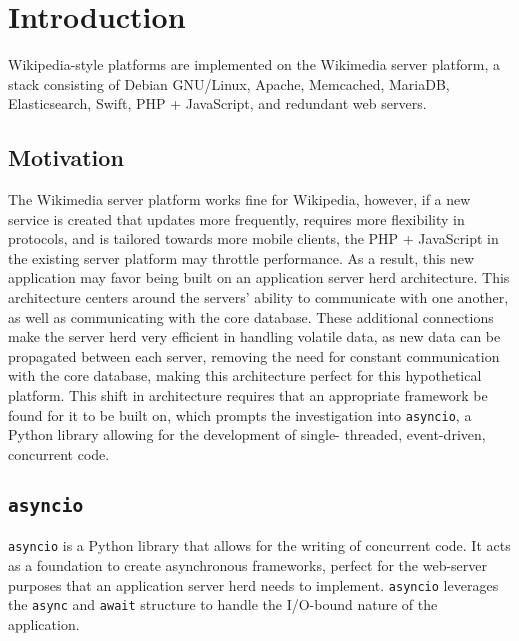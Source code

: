 \section{Introduction}
\par
Wikipedia-style platforms are implemented on the Wikimedia server platform, a
stack consisting of Debian GNU/Linux, Apache, Memcached, MariaDB, Elasticsearch,
Swift, PHP + JavaScript, and redundant web servers. 

\subsection{Motivation}
\par
The Wikimedia server platform works fine for Wikipedia, however, if a new
service is created that updates more frequently, requires more flexibility in
protocols, and is tailored towards more mobile clients, the PHP + JavaScript in
the existing server platform may throttle performance. As a result, this new
application may favor being built on an application server herd architecture.
This architecture centers around the servers' ability to communicate with one
another, as well as communicating with the core database. These additional
connections make the server herd very efficient in handling volatile data, as
new data can be propagated between each server, removing the need for constant
communication with the core database, making this architecture perfect for this
hypothetical platform. This shift in architecture requires that an appropriate
framework be found for it to be built on, which prompts the investigation into
\texttt{asyncio}, a Python library allowing for the development of single-
threaded, event-driven, concurrent code.

\subsection{\texttt{asyncio}}
\par
\texttt{asyncio} is a Python library that allows for the writing of concurrent
code. It acts as a foundation to create asynchronous frameworks, perfect for the
web-server purposes that an application server herd needs to implement.
\texttt{asyncio} leverages the \texttt{async} and \texttt{await} structure to
handle the I/O-bound nature of the application.

